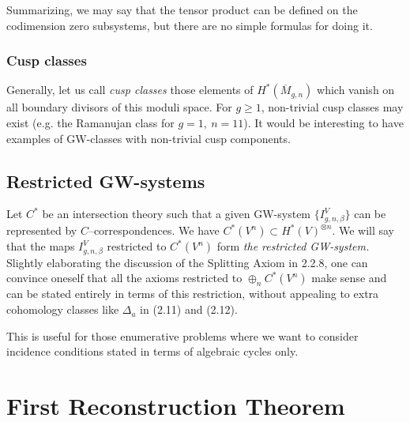 \documentclass[reqno]{amsart}
\theoremstyle{definition}
\begin{document}
\smallskip

Summarizing,  we may say that
the tensor product can be defined on the codimension zero
subsystems, but there are no simple formulas for doing it.

\smallskip

\subsubsection{Cusp classes}
Generally, let us call {\it cusp classes}
those elements of $H^*(\overline{M}_{g,n})$ which vanish on all boundary
divisors of this moduli space. For $g\ge 1$, non-trivial
cusp classes may exist (e.g. the Ramanujan class for $g=1,\ n=11$).
It would be interesting to have examples of GW-classes
with non-trivial cusp components.

\medskip

\subsection{Restricted GW-systems}
Let $C^*$ be an intersection theory
such that a given GW-system $\{I^V_{g,n,\beta}\}$ can be represented
by $C$--correspondences. We have $C^*(V^n)\subset H^*(V)^{\otimes n}$.
We will say that the maps $I^V_{g,n,\beta}$ restricted to $C^*(V^n)$
form {\it the restricted GW-system.} Slightly elaborating the discussion
of the Splitting Axiom in 2.2.8, one can convince oneself that
all the axioms restricted to $\oplus_nC^*(V^n)$ make sense
and can be stated entirely in terms of this restriction, without appealing
to extra cohomology classes like $\Delta_a$ in (2.11) and (2.12).

\smallskip

This is useful for those enumerative problems where we want to consider
incidence conditions stated in terms of algebraic cycles only.

\newpage


\section{First Reconstruction Theorem}


\end{document}
